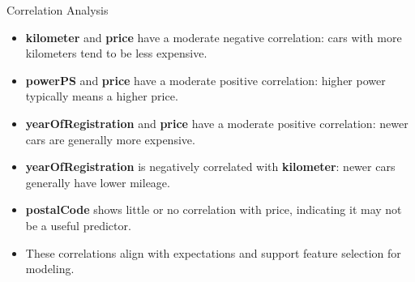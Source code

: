 \documentclass{beamer}
\begin{document}
\begin{frame}{Correlation Analysis}
        \begin{itemize}
                \item \textbf{kilometer} and \textbf{price} have a moderate
                        negative correlation: cars with more kilometers tend to
                        be less expensive.
                \item \textbf{powerPS} and \textbf{price} have a moderate
                        positive correlation: higher power typically means a
                        higher price.
                \item \textbf{yearOfRegistration} and \textbf{price} have a
                        moderate positive correlation: newer cars are generally
                        more expensive.
                \item \textbf{yearOfRegistration} is negatively correlated with
                        \textbf{kilometer}: newer cars generally have lower
                        mileage.
                \item \textbf{postalCode} shows little or no correlation with
                        price, indicating it may not be a useful predictor.
                \item These correlations align with expectations and support
                        feature selection for modeling.
        \end{itemize}
\end{frame}

\end{document}
